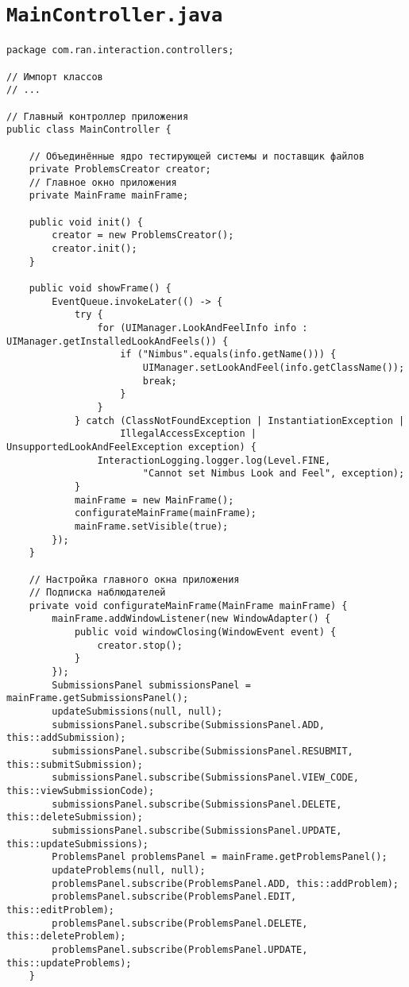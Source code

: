 \section*{\texttt{MainController.java}}
\begin{verbatim}
package com.ran.interaction.controllers;

// Импорт классов
// ...

// Главный контроллер приложения
public class MainController {

    // Объединённые ядро тестирующей системы и поставщик файлов
    private ProblemsCreator creator;
    // Главное окно приложения
    private MainFrame mainFrame;

    public void init() {
        creator = new ProblemsCreator();
        creator.init();
    }
    
    public void showFrame() {
        EventQueue.invokeLater(() -> {
            try {
                for (UIManager.LookAndFeelInfo info : UIManager.getInstalledLookAndFeels()) {
                    if ("Nimbus".equals(info.getName())) {
                        UIManager.setLookAndFeel(info.getClassName());
                        break;
                    }
                }
            } catch (ClassNotFoundException | InstantiationException |
                    IllegalAccessException | UnsupportedLookAndFeelException exception) {
                InteractionLogging.logger.log(Level.FINE,
                        "Cannot set Nimbus Look and Feel", exception);
            }
            mainFrame = new MainFrame();
            configurateMainFrame(mainFrame);
            mainFrame.setVisible(true);
        });
    }

    // Настройка главного окна приложения
    // Подписка наблюдателей
    private void configurateMainFrame(MainFrame mainFrame) {
        mainFrame.addWindowListener(new WindowAdapter() {
            public void windowClosing(WindowEvent event) {
                creator.stop();
            }
        });
        SubmissionsPanel submissionsPanel = mainFrame.getSubmissionsPanel();
        updateSubmissions(null, null);
        submissionsPanel.subscribe(SubmissionsPanel.ADD, this::addSubmission);
        submissionsPanel.subscribe(SubmissionsPanel.RESUBMIT, this::submitSubmission);
        submissionsPanel.subscribe(SubmissionsPanel.VIEW_CODE, this::viewSubmissionCode);
        submissionsPanel.subscribe(SubmissionsPanel.DELETE, this::deleteSubmission);
        submissionsPanel.subscribe(SubmissionsPanel.UPDATE, this::updateSubmissions);
        ProblemsPanel problemsPanel = mainFrame.getProblemsPanel();
        updateProblems(null, null);
        problemsPanel.subscribe(ProblemsPanel.ADD, this::addProblem);
        problemsPanel.subscribe(ProblemsPanel.EDIT, this::editProblem);
        problemsPanel.subscribe(ProblemsPanel.DELETE, this::deleteProblem);
        problemsPanel.subscribe(ProblemsPanel.UPDATE, this::updateProblems);
    }
    

\end{verbatim}
